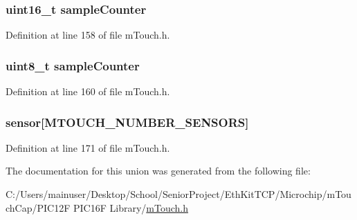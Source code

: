 \subsubsection[{sample\+Counter}]{\setlength{\rightskip}{0pt plus 5cm}uint16\+\_\+t sample\+Counter}\label{structm_touch___state_variables_a99c520ba011c1d8bcb6a72ffd51196c9}


Definition at line 158 of file m\+Touch.\+h.

\hypertarget{structm_touch___state_variables_a5413f90a1ad32d11a00aa20df8d9ba3c}{}
\subsubsection[{sample\+Counter}]{\setlength{\rightskip}{0pt plus 5cm}uint8\+\_\+t sample\+Counter}\label{structm_touch___state_variables_a5413f90a1ad32d11a00aa20df8d9ba3c}


Definition at line 160 of file m\+Touch.\+h.

\hypertarget{structm_touch___state_variables_a4205dd81984b86d07522a6bd719e2c99}{}
\subsubsection[{sensor}]{ sensor\mbox{[}M\+T\+O\+U\+C\+H\+\_\+\+N\+U\+M\+B\+E\+R\+\_\+\+S\+E\+N\+S\+O\+R\+S\mbox{]}}\label{structm_touch___state_variables_a4205dd81984b86d07522a6bd719e2c99}


Definition at line 171 of file m\+Touch.\+h.



The documentation for this union was generated from the following file\+:\begin{DoxyCompactItemize}
\item 
C\+:/\+Users/mainuser/\+Desktop/\+School/\+Senior\+Project/\+Eth\+Kit\+T\+C\+P/\+Microchip/m\+Touch\+Cap/\+P\+I\+C12\+F P\+I\+C16\+F Library/\hyperlink{m_touch_cap_2_p_i_c12_f_01_p_i_c16_f_01_library_2m_touch_8h}{m\+Touch.\+h}\end{DoxyCompactItemize}
